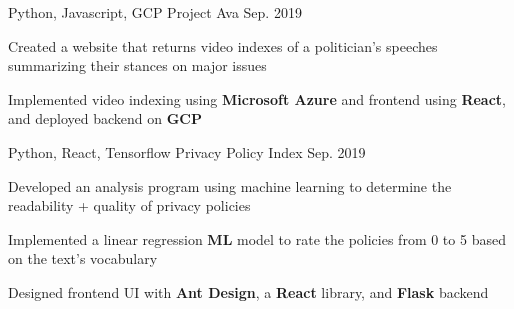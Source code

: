 

\begin{cventries}

  \cventry
    {Python, Javascript, GCP} %
    {Project Ava}
    {Sep. 2019}
    {} %
    {
      \begin{cvitems} %
        \item {Created a website that returns video indexes of a politician's speeches summarizing their stances on major issues}
        \item {Implemented video indexing using \textbf{Microsoft Azure} and frontend using \textbf{React}, and deployed backend on \textbf{GCP}}
      \end{cvitems}
    }

  \cventry
    {Python, React, Tensorflow} %
    {Privacy Policy Index}
    {Sep. 2019}
    {} %
    {
      \begin{cvitems} %
        \item {Developed an analysis program using machine learning to determine the readability + quality of privacy policies}
        \item {Implemented a linear regression \textbf{ML} model to rate the policies from 0 to 5 based on the text's vocabulary}
        \item {Designed frontend UI with \textbf{Ant Design}, a \textbf{React} library, and \textbf{Flask} backend}
      \end{cvitems}
    }



\end{cventries}
